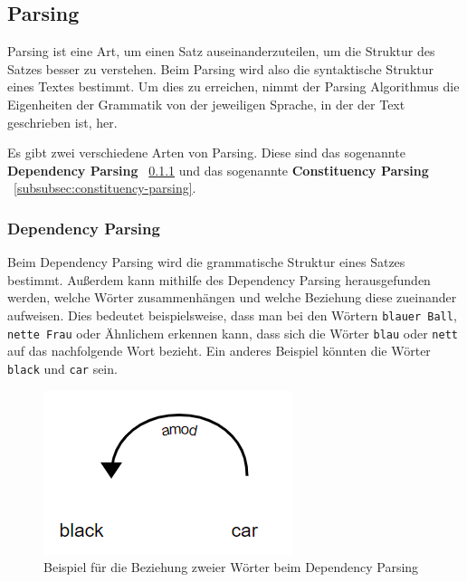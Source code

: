 \subsection{Parsing}

Parsing ist eine Art, um einen Satz auseinanderzuteilen, um die Struktur des Satzes besser zu verstehen.
Beim Parsing wird also die syntaktische Struktur eines Textes bestimmt.
Um dies zu erreichen, nimmt der Parsing Algorithmus die Eigenheiten der Grammatik von der jeweiligen Sprache, in der der Text geschrieben ist, her.\cite{textAnalysisMonkeylearn}

Es gibt zwei verschiedene Arten von Parsing.
Diese sind das sogenannte \textbf{Dependency Parsing} ~\ref{subsubsec:dependency-parsing} und das sogenannte \textbf{Constituency Parsing} ~\ref{subsubsec:constituency-parsing}.

\subsubsection{Dependency Parsing}\label{subsubsec:dependency-parsing}

Beim Dependency Parsing wird die grammatische Struktur eines Satzes bestimmt.
Außerdem kann mithilfe des Dependency Parsing herausgefunden werden, welche Wörter zusammenhängen und welche Beziehung diese zueinander aufweisen.
Dies bedeutet beispielsweise, dass man bei den Wörtern \texttt{blauer Ball}, \texttt{nette Frau} oder Ähnlichem erkennen kann, dass sich die Wörter \texttt{blau} oder \texttt{nett} auf das nachfolgende Wort bezieht.
Ein anderes Beispiel könnten die Wörter \texttt{black} und \texttt{car} sein.

\begin{figure}[hbt!]
    \centering
    \includegraphics[scale=1]{pics/dependency_parsing}
    \caption{Beispiel für die Beziehung zweier Wörter beim Dependency Parsing~\cite{dependencyParsing}}
    \label{fig:dependency_parsing_relation}
\end{figure}

